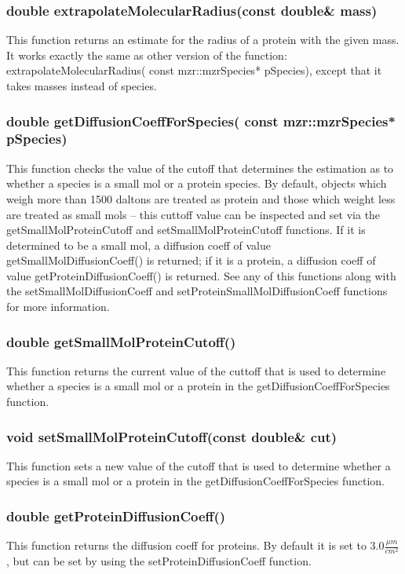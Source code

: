 \subsubsection{double extrapolateMolecularRadius(const double\& mass)}
This function returns an estimate for the radius of a protein with the
given mass.  It works exactly the same as other version of the
function: extrapolateMolecularRadius( const mzr::mzrSpecies*
pSpecies), except that it takes masses instead of species.

\subsubsection{double getDiffusionCoeffForSpecies( const
  mzr::mzrSpecies* pSpecies)}
This function checks the value of the cutoff that determines the
estimation as to whether a species is a small mol or a protein species.
By default, objects which weigh more than 1500 daltons are treated as
protein and those which weight less are treated as small mols -- this
cuttoff value can be inspected and set via the
getSmallMolProteinCutoff and setSmallMolProteinCutoff functions.  If
it is determined to be a small mol, a diffusion coeff of value
getSmallMolDiffusionCoeff() is returned; if it is a protein, a
diffusion coeff of value getProteinDiffusionCoeff() is returned.  See
any of this functions along with the setSmallMolDiffusionCoeff and
setProteinSmallMolDiffusionCoeff functions for more information.

\subsubsection{double getSmallMolProteinCutoff()}
This function returns the current value of the cuttoff that is used to
determine whether a species is a small mol or a protein in the
getDiffusionCoeffForSpecies function. 

\subsubsection{void setSmallMolProteinCutoff(const double\& cut)}
This function sets a new value of the cutoff that is used to determine
whether a species is a small mol or a protein in the
getDiffusionCoeffForSpecies function. 

\subsubsection{double getProteinDiffusionCoeff()}
This function returns the diffusion coeff for proteins.  By default it
is set to $3.0\frac{\mu m}{cm^2}$, but can be set by using the
setProteinDiffusionCoeff function.


